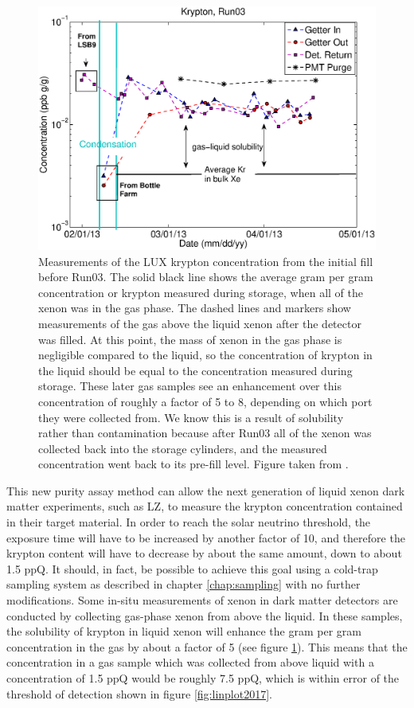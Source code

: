 \begin{figure}[h!]
  \includegraphics[width=\linewidth]{Figures/Kr.eps}
  \caption{Measurements of the LUX krypton concentration from the initial fill before Run03. The solid black line shows the average gram per gram concentration or krypton measured during storage, when all of the xenon was in the gas phase. The dashed lines and markers show measurements of the gas above the liquid xenon after the detector was filled. At this point, the mass of xenon in the gas phase is negligible compared to the liquid, so the concentration of krypton in the liquid should be equal to the concentration measured during storage. These later gas samples see an enhancement over this concentration of roughly a factor of 5 to 8, depending on which port they were collected from. We know this is a result of solubility rather than contamination because after Run03 all of the xenon was collected back into the storage cylinders, and the measured concentration went back to its pre-fill level. Figure taken from \cite{attila_sol}. }
  \label{fig:krsol}
\end{figure}
This new purity assay method can allow the next generation of liquid xenon dark matter experiments, such as LZ, to measure the krypton concentration contained in their target material. In order to reach the solar neutrino threshold, the exposure time will have to be increased by another factor of 10, and therefore the krypton content will have to decrease by about the same amount, down to about 1.5 ppQ. It should, in fact, be possible to achieve this goal using a cold-trap sampling system as described in chapter \ref{chap:sampling} with no further modifications. Some in-situ measurements of xenon in dark matter detectors are conducted by collecting gas-phase xenon from above the liquid. In these samples, the solubility of krypton in liquid xenon will enhance the gram per gram concentration in the gas by about a factor of 5 (see figure \ref{fig:krsol})\cite{attila_sol}. This means that the concentration in a gas sample which was collected from above liquid with a concentration of 1.5 ppQ would be roughly 7.5 ppQ, which is within error of the threshold of detection shown in figure \ref{fig:linplot2017}.


















